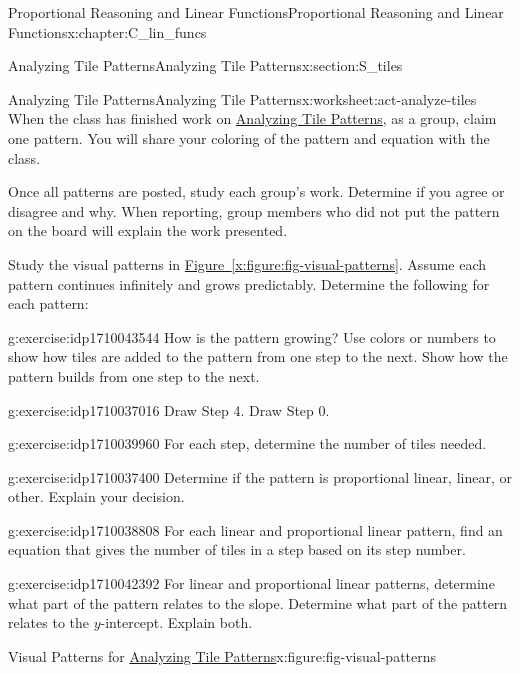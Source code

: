 \documentclass[oneside,10pt,]{book}
\newcommand{\xreffont}{\relax}
\numberwithin{equation}{chapter}
\begin{document}
\begin{chapterptx}{Proportional Reasoning and Linear Functions}{}{Proportional Reasoning and Linear Functions}{}{}{x:chapter:C_lin_funcs}
\begin{sectionptx}{Analyzing Tile Patterns}{}{Analyzing Tile Patterns}{}{}{x:section:S_tiles}
\begin{worksheet-subsection}{Analyzing Tile Patterns}{}{Analyzing Tile Patterns}{}{}{x:worksheet:act-analyze-tiles}
When the class has finished work on \hyperref[x:worksheet:act-analyze-tiles]{Analyzing Tile Patterns}, as a group, claim one pattern. You will share your coloring of the pattern and equation with the class.%
\par
Once all patterns are posted, study each group's work. Determine if you agree or disagree and why. When reporting, group members who did not put the pattern on the board will explain the work presented.%
\par
Study the visual patterns in \hyperref[x:figure:fig-visual-patterns]{Figure~{\xreffont\ref{x:figure:fig-visual-patterns}}}. Assume each pattern continues infinitely and grows predictably. Determine the following for each pattern:%
\begin{divisionexercise}{1}{}{}{g:exercise:idp1710043544}%
How is the pattern growing? Use colors or numbers to show how tiles are added to the pattern from one step to the next. Show how the pattern builds from one step to the next.%
\end{divisionexercise}%
\begin{divisionexercise}{2}{}{}{g:exercise:idp1710037016}%
Draw Step 4. Draw Step 0.%
\end{divisionexercise}%
\begin{divisionexercise}{3}{}{}{g:exercise:idp1710039960}%
For each step, determine the number of tiles needed.%
\end{divisionexercise}%
\begin{divisionexercise}{4}{}{}{g:exercise:idp1710037400}%
Determine if the pattern is proportional linear, linear, or other. Explain your decision.%
\end{divisionexercise}%
\begin{divisionexercise}{5}{}{}{g:exercise:idp1710038808}%
For each linear and proportional linear pattern, find an equation that gives the number of tiles in a step based on its step number.%
\end{divisionexercise}%
\begin{divisionexercise}{6}{}{}{g:exercise:idp1710042392}%
For linear and proportional linear patterns, determine what part of the pattern relates to the slope. Determine what part of the pattern relates to the \(y\)-intercept. Explain both.%
\end{divisionexercise}%
\clearpage
\begin{figureptx}{Visual Patterns for \hyperref[x:worksheet:act-analyze-tiles]{Analyzing Tile Patterns}}{x:figure:fig-visual-patterns}{}%
\begin{image}{0}{1}{0}%

\end{image}
\end{figureptx}
\end{worksheet-subsection}
\end{sectionptx}
\end{chapterptx}
\end{document}
